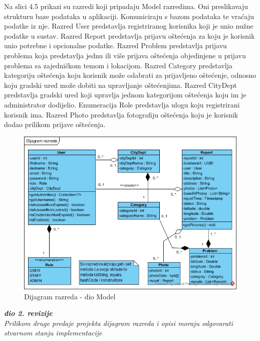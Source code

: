 Na slici 4.5 prikazi su razredi koji pripadaju Model razredima. Oni preslikavaju strukturu baze podataka
u aplikaciji. Komuniciraju s bazom podataka te vraćaju podatke iz nje. Razred User predstavlja registriranog
korisnika koji je unio nužne podatke u sustav. Razred Report predstavlja prijavu oštećenja za koju je korisnik
unio potrebne i opcionalne podatke. Razred Problem predstavlja prijavu problema koja predstavlja jednu ili više
prijava oštećenja objedinjene u prijavu problema sa zajedničkom temom i lokacijom. Razred Category predstavlja
kategoriju oštećenja koju korisnik može odabrati za prijavljeno oštećenje, odnosno koju gradski ured može dobiti
na upravljanje oštećenjima. Razred CityDept predstavlja gradski ured koji upravlja jednom kategorijom oštećenja
koju im je administrator dodijelio. Enumeracija Role predstavlja ulogu koju registrirani korisnik ima. Razred
Photo predstavlja fotografiju oštećenja koju je korisnik dodao prilikom prijave oštećenja.

\begin{figure}[H]
	\includegraphics[scale=0.60]{slike/DR-model.jpg} %
	\centering
	\caption{Dijagram razreda - dio Model}
	\label{fig:DijagramRazredaModel}
\end{figure}


\textbf{\textit{dio 2. revizije}}\\

\textit{Prilikom druge predaje projekta dijagram razreda i opisi moraju odgovarati stvarnom stanju implementacije}



\eject

